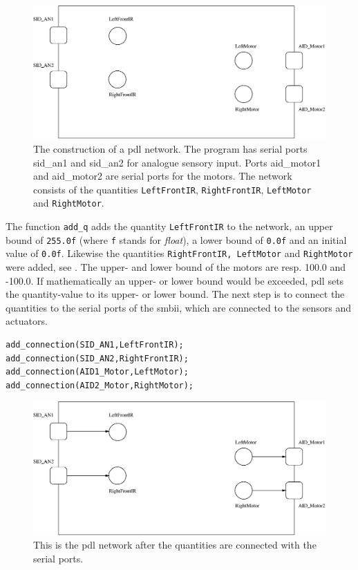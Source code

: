 \begin{figure}
\centerline{\includegraphics[width=12cm]{robots//pdl_networka.eps}}
\caption{The construction of a {\sc pdl} network. The program has serial ports {\sc sid\_an1} and {\sc sid\_an2} for analogue sensory input. Ports {\sc aid\_motor1} and {\sc aid\_motor2} are serial ports for the motors. The network consists of the quantities \texttt{LeftFrontIR}, \texttt{RightFrontIR}, \texttt{LeftMotor} and \texttt{RightMotor}.}
\label{f:robots:pdl_networka}
\end{figure}
\noindent
The function \texttt{add\_q} adds the quantity \texttt{LeftFrontIR} to the network, an upper bound of \texttt{255.0f} (where \texttt{f} stands for {\em float}), a lower bound of \texttt{0.0f} and an initial value of \texttt{0.0f}. Likewise the quantities \texttt{RightFrontIR, LeftMotor} and \texttt{RightMotor} were added, see . The upper- and lower bound of the motors are resp. 100.0 and -100.0. If mathematically an upper- or lower bound would be exceeded, {\sc pdl} sets the quantity-value to its upper- or lower bound. The next step is to connect the quantities to the serial ports of the {\sc smbii}, which are connected to the sensors and actuators.


{\small\begin{verbatim}
add_connection(SID_AN1,LeftFrontIR);
add_connection(SID_AN2,RightFrontIR);
add_connection(AID1_Motor,LeftMotor);
add_connection(AID2_Motor,RightMotor);
\end{verbatim}}

\begin{figure}
\centerline{\includegraphics[width=12cm]{robots//pdl_networkb.eps}}
\caption{This is the {\sc pdl} network after the quantities are connected with the serial ports.}
\label{f:robots:pdl_networkb}
\end{figure}



